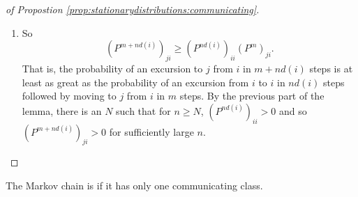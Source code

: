 \documentclass[12pt]{article}
\begin{document}
\begin{enumerate}
\begin{proof}[of Propostion \ref{prop:stationarydistributions:communicating}]
\begin{enumerate}
\begin{enumerate}
                    \[
                        (P^{n_j})_{ii} = (P^{m_{ij} + m_{ji}})_{ii} \ge
                        (P^{m_{ij}})_{ij } (P^{m_{ji}})_{ji} > 0.
                    \] That is, the probability of a return to \( i \)
                    from \( i \) in \( n_j \) steps is at least as great
                    as the probability of an excursion from \( i \) to \(
                    j \) in \( m_{ij} \) steps with return to \( i \)
                    from \( j \) in \( m_{ji} \) steps.
                \item
                    Next note that if \( (P^{n_j})_{ii} > 0 \) implies
                    that for any positive integer \( c_j \), \( (P^{c_j
                    n_j})_ {ii} > 0 \), that is, the probability of \( c_j
                    \) sequential returns is still positive.

                    Should assert here that \( d(i) \) is the \( \gcd(n_1,
                    \dots, n_k) \).  (Note:  Certainly by the previous, \(
                    d(i) \) is a divisor, but is it the greatest?)
                \item
                    By the number theoretic Lemma~%
                    \ref{lem:stationarydistributions:numtheory}, there
                    exists \( N \) and positive integers \( c_1, \dots,
                    c_k \) such that if \( n \ge N \)
                    \[
                        (P^{n d(i)})_{ii} = (P^{c_1 n_1 + \dots + c_k n_k})_
                        {ii} \ge (P^{c_1 n_1})_{ii} \cdot \dots \cdot (P^
                        {c_k n_k})_{ii} >0.
                    \]
            \end{enumerate}
          \item
            So
            \[
                (P^{m + n d(i)})_{ji} \ge (P^{n d(i)})_{ii} (P^m)_{ji}.
            \] That is, the probability of an excursion to \( j \) from \(
            i \) in \( m + n d(i) \) steps is at least as great as the
            probability of an excursion from \( i \) to \( i \) in \( n
            d(i) \) steps followed by moving to \( j \) from \( i \) in \(
            m \) steps.  By the previous part of the lemma, there is an \(
            N \) such that for \( n \ge N \), \( (P^{n d(i)})_{ii} > 0 \)
            and so \( (P^{m + n d(i)})_{ji} >0 \) for sufficiently large
            \( n \).
    \end{enumerate}
\end{proof}

\begin{definition}
    The Markov chain is  if it has only one
    communicating class.
\end{definition}


\end{enumerate}
\end{document}

